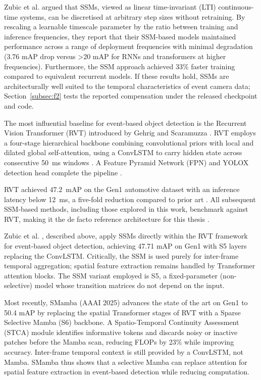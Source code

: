 \documentclass[11pt, a4paper]{report}
\begin{document}
Zubic et al. \cite{zubic2024state} argued that SSMs, viewed as linear time-invariant (LTI) continuous-time systems, can be discretised at arbitrary step sizes without retraining. By rescaling a learnable timescale parameter by the ratio between training and inference frequencies, they report that their SSM-based models maintained performance across a range of deployment frequencies with minimal degradation (3.76 mAP drop versus >20 mAP for RNNs and transformers at higher frequencies). Furthermore, the SSM approach achieved 33\% faster training compared to equivalent recurrent models. If these results hold, SSMs are architecturally well suited to the temporal characteristics of event camera data; Section~\ref{subsec:f2} tests the reported compensation under the released checkpoint and code. 

The most influential baseline for event-based object detection is the Recurrent Vision Transformer (RVT) introduced by Gehrig and Scaramuzza \cite{gehrig2023recurrent}. RVT employs a four-stage hierarchical backbone combining convolutional priors with local and dilated global self-attention, using a ConvLSTM to carry hidden state across consecutive 50~ms windows \cite{gehrig2023recurrent}. A Feature Pyramid Network (FPN) and YOLOX detection head complete the pipeline \cite{gehrig2023recurrent}. 

RVT achieved $47.2$~mAP on the Gen1 automotive dataset with an inference latency below 12~ms, a five-fold reduction compared to prior art \cite{gehrig2023recurrent}. All subsequent SSM-based methods, including those explored in this work, benchmark against RVT, making it the de facto reference architecture for this thesis \cite{gehrig2023recurrent, zubic2024state, yang2025smamba}.

Zubic et al. \cite{zubic2024state}, described above, apply SSMs directly within the RVT framework for event-based object detection, achieving 47.71 mAP on Gen1 with S5 layers replacing the ConvLSTM. Critically, the SSM is used purely for inter-frame temporal aggregation; spatial feature extraction remains handled by Transformer attention blocks. The SSM variant employed is S5, a fixed-parameter (non-selective) model whose transition matrices do not depend on the input. 

Most recently, SMamba \cite{yang2025smamba} (AAAI 2025) advances the state of the art on Gen1 to 50.4 mAP by replacing the spatial Transformer stages of RVT with a Sparse Selective Mamba (S6) backbone. A Spatio-Temporal Continuity Assessment (STCA) module identifies informative tokens and discards noisy or inactive patches before the Mamba scan, reducing FLOPs by 23\% while improving accuracy. Inter-frame temporal context is still provided by a ConvLSTM, not Mamba. SMamba thus shows that a selective Mamba can replace attention for spatial feature extraction in event-based detection while reducing computation. 
\end{document}
